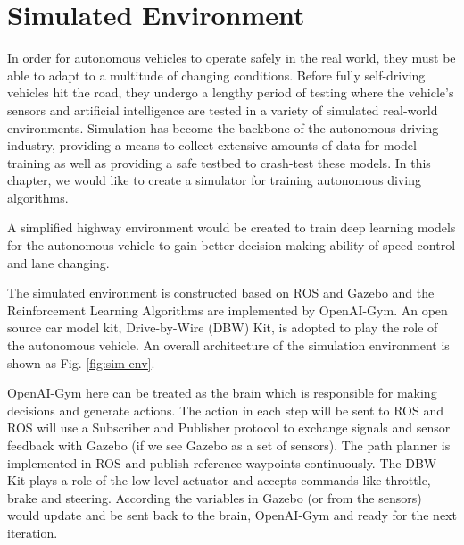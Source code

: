 \chapter{Simulated Environment} 

% 

In order for autonomous vehicles to operate safely in the real world, they must be able to adapt to a multitude of changing conditions. Before fully self-driving vehicles hit the road, they undergo a lengthy period of testing where the vehicle's sensors and artificial intelligence are tested in a variety of simulated real-world environments. Simulation has become the backbone of the autonomous driving industry, providing a means to collect extensive amounts of data for model training as well as providing a safe testbed to crash-test these models. In this chapter, we would like to create a simulator for training autonomous diving algorithms.

A simplified highway environment would be created to train deep learning models for the autonomous vehicle to gain better decision making ability of speed control and  lane changing.

The simulated environment is constructed based on ROS and Gazebo and the Reinforcement Learning Algorithms are implemented by OpenAI-Gym. An open source car model kit, Drive-by-Wire (DBW) Kit, is adopted to play the role of the autonomous vehicle. An overall architecture of the simulation environment is shown as Fig. \ref{fig:sim-env}.

OpenAI-Gym here can be treated as the brain which is responsible for making decisions and generate actions. The action in each step will be sent to ROS and ROS will use a Subscriber and Publisher protocol to exchange signals and sensor feedback with Gazebo (if we see Gazebo as a set of sensors). The path planner is implemented in ROS and publish reference waypoints continuously. The DBW Kit plays a role of the low level actuator and accepts commands like throttle, brake and steering. According the variables in Gazebo (or from the sensors) would update and be sent back to the brain, OpenAI-Gym and ready for the next iteration.

